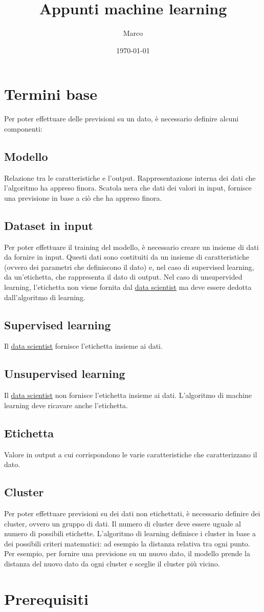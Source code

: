 \documentclass[11pt]{article}
\author{Marco}
\date{\today}
\title{Appunti machine learning}
\begin{document}
\maketitle
\tableofcontents


\section{Termini base}
\label{sec:orga1a765c}
Per poter effettuare delle previsioni su un dato, è necessario definire alcuni componenti:
\subsection{Modello}
\label{sec:org40c552f}
Relazione tra le caratteristiche e l'output.
Rappresentazione interna dei dati che l'algoritmo ha appreso finora. Scatola nera che dati dei valori in input, fornisce una previsione in base a ciò che ha appreso finora.
\subsection{Dataset in input}
\label{sec:org05962f6}
Per poter effettuare il training del modello, è necessario creare un insieme di dati da fornire in input. Questi dati sono costituiti da un insieme di caratteristiche (ovvero dei parametri che definiscono il dato) e, nel caso di supervised learning, da un'etichetta, che rappresenta il dato di output. Nel caso di unsupervided learning, l'etichetta non viene fornita dal \uline{data scientist} ma deve essere dedotta dall'algoritmo di learning.
\subsection{Supervised learning}
\label{sec:org23482e2}
Il \uline{data scientist} fornisce l'etichetta insieme ai dati.
\subsection{Unsupervised learning}
\label{sec:orgd81b16f}
Il \uline{data scientist} non fornisce l'etichetta insieme ai dati. L'algoritmo di machine learning deve ricavare anche l'etichetta.
\subsection{Etichetta}
\label{sec:org3a62e33}
Valore in output a cui corrispondono le varie caratteristiche che caratterizzano il dato.
\subsection{Cluster}
\label{sec:orgea90055}
Per poter effettuare previsioni su dei dati non etichettati, è necessario definire dei cluster, ovvero un gruppo di dati. Il numero di cluster deve essere uguale al numero di possibili etichette. L'algoritmo di learning definisce i cluster in base a dei possibili criteri matematici: ad esempio la distanza relativa tra ogni punto. Per esempio, per fornire una previsione su un nuovo dato, il modello prende la distanza del nuovo dato da ogni cluster e sceglie il cluster più vicino.

\section{Prerequisiti}
\label{sec:org3168cb6}
\end{document}
